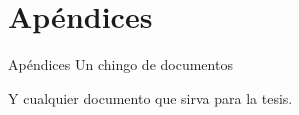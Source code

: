 \section{Ap\'endices}
\label{Apendices}

Ap\'endices
Un chingo de documentos















Y cualquier documento que sirva para la tesis.